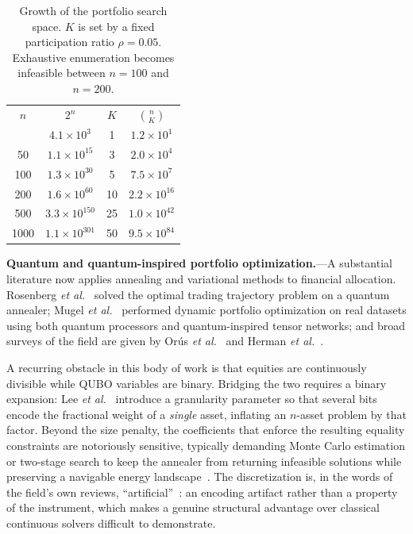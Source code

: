 \documentclass[aps, reprint, prl, twocolumn, superscriptaddress,amsmath,amssymb,noeprint]{revtex4-2}
\begin{document}
\begin{table}[b]
\caption{\label{tab:scaling}Growth of the portfolio search space.  $K$ is
set by a fixed participation ratio $\rho = 0.05$.  Exhaustive enumeration
becomes infeasible between $n = 100$ and $n = 200$.}
\begin{ruledtabular}
\begin{tabular}{cccc}
$n$ & $2^n$ & $K$ & $\binom{n}{K}$ \\
\colrule
12   & $4.1\times10^{3}$   & 1  & $1.2\times10^{1}$ \\
50   & $1.1\times10^{15}$  & 3  & $2.0\times10^{4}$ \\
100  & $1.3\times10^{30}$  & 5  & $7.5\times10^{7}$ \\
200  & $1.6\times10^{60}$  & 10 & $2.2\times10^{16}$ \\
500  & $3.3\times10^{150}$ & 25 & $1.0\times10^{42}$ \\
1000 & $1.1\times10^{301}$ & 50 & $9.5\times10^{84}$ \\
\end{tabular}
\end{ruledtabular}
\end{table}

\textbf{Quantum and quantum-inspired portfolio optimization.}---A
substantial literature now applies annealing and variational methods to
financial allocation.  Rosenberg \textit{et al.}~\cite{rosenberg2016}
solved the optimal trading trajectory problem on a quantum annealer;
Mugel \textit{et al.}~\cite{mugel2022} performed dynamic portfolio
optimization on real datasets using both quantum processors and
quantum-inspired tensor networks; and broad surveys of the field are
given by Or\'{u}s \textit{et al.}~\cite{orus2019} and Herman \textit{et
al.}~\cite{herman2023}.

A recurring obstacle in this body of work is that equities are
continuously divisible while QUBO variables are binary.  Bridging the two
requires a binary expansion: Lee \textit{et al.}~\cite{lee2024} introduce
a granularity parameter so that several bits encode the fractional weight
of a \emph{single} asset, inflating an $n$-asset problem by that factor.
Beyond the size penalty, the coefficients that enforce the resulting
equality constraints are notoriously sensitive, typically demanding Monte
Carlo estimation or two-stage search to keep the annealer from returning
infeasible solutions while preserving a navigable energy
landscape~\cite{lee2024,verma2022}.  The discretization is, in the words
of the field's own reviews, ``artificial''~\cite{herman2023}: an encoding
artifact rather than a property of the instrument, which makes a genuine
structural advantage over classical continuous solvers difficult to
demonstrate.
\end{document}
